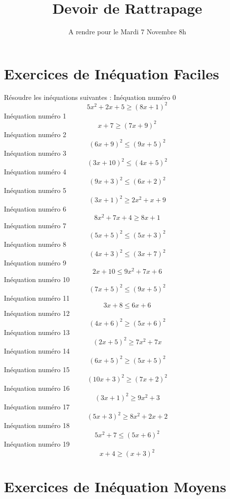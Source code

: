 \documentclass{article}
\title{Devoir de Rattrapage}
\date{A rendre pour le Mardi 7 Novembre 8h}\usepackage{natbib}
\begin{document}
\maketitle
 \section{Exercices de In\'equation Faciles}

 R\'esoudre les in\'equations suivantes : 
In\'equation num\'ero 0 \[5 x^{2} + 2 x + 5 \geq \left(8 x + 1\right)^{2}\]In\'equation num\'ero 1 \[x + 7 \geq \left(7 x + 9\right)^{2}\]In\'equation num\'ero 2 \[\left(6 x + 9\right)^{2} \leq \left(9 x + 5\right)^{2}\]In\'equation num\'ero 3 \[\left(3 x + 10\right)^{2} \leq \left(4 x + 5\right)^{2}\]In\'equation num\'ero 4 \[\left(9 x + 3\right)^{2} \leq \left(6 x + 2\right)^{2}\]In\'equation num\'ero 5 \[\left(3 x + 1\right)^{2} \geq 2 x^{2} + x + 9\]In\'equation num\'ero 6 \[8 x^{2} + 7 x + 4 \geq 8 x + 1\]In\'equation num\'ero 7 \[\left(5 x + 5\right)^{2} \leq \left(5 x + 3\right)^{2}\]In\'equation num\'ero 8 \[\left(4 x + 3\right)^{2} \leq \left(3 x + 7\right)^{2}\]In\'equation num\'ero 9 \[2 x + 10 \leq 9 x^{2} + 7 x + 6\]In\'equation num\'ero 10 \[\left(7 x + 5\right)^{2} \leq \left(9 x + 5\right)^{2}\]In\'equation num\'ero 11 \[3 x + 8 \leq 6 x + 6\]In\'equation num\'ero 12 \[\left(4 x + 6\right)^{2} \geq \left(5 x + 6\right)^{2}\]In\'equation num\'ero 13 \[\left(2 x + 5\right)^{2} \geq 7 x^{2} + 7 x\]In\'equation num\'ero 14 \[\left(6 x + 5\right)^{2} \geq \left(5 x + 5\right)^{2}\]In\'equation num\'ero 15 \[\left(10 x + 3\right)^{2} \geq \left(7 x + 2\right)^{2}\]In\'equation num\'ero 16 \[\left(3 x + 1\right)^{2} \geq 9 x^{2} + 3\]In\'equation num\'ero 17 \[\left(5 x + 3\right)^{2} \geq 8 x^{2} + 2 x + 2\]In\'equation num\'ero 18 \[5 x^{2} + 7 \leq \left(5 x + 6\right)^{2}\]In\'equation num\'ero 19 \[x + 4 \geq \left(x + 3\right)^{2}\]
 \section{Exercices de In\'equation Moyens}
\end{document}
